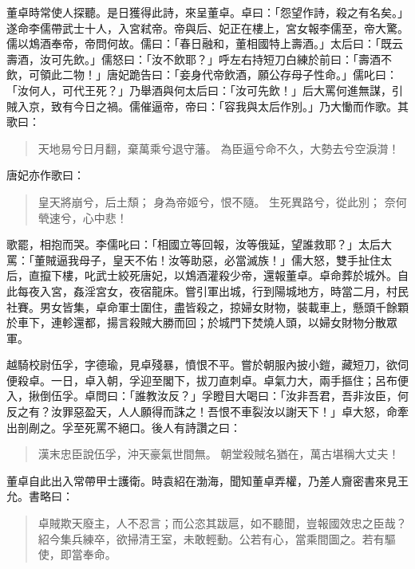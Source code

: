 董卓時常使人探聽。是日獲得此詩，來呈董卓。卓曰：「怨望作詩，殺之有名矣。」遂命李儒帶武士十人，入宮弒帝。帝與后、妃正在樓上，宮女報李儒至，帝大驚。儒以鴆酒奉帝，帝問何故。儒曰：「春日融和，董相國特上壽酒。」太后曰：「既云壽酒，汝可先飲。」儒怒曰：「汝不飲耶？」呼左右持短刀白練於前曰：「壽酒不飲，可領此二物！」唐妃跪告曰：「妾身代帝飲酒，願公存母子性命。」儒叱曰：「汝何人，可代王死？」乃舉酒與何太后曰：「汝可先飲！」后大罵何進無謀，引賊入京，致有今日之禍。儒催逼帝，帝曰：「容我與太后作別。」乃大慟而作歌。其歌曰：

\begin{quote}
天地易兮日月翻，棄萬乘兮退守藩。
為臣逼兮命不久，大勢去兮空淚潸！
\end{quote}

唐妃亦作歌曰：

\begin{quote}
皇天將崩兮，后土頹；
身為帝姬兮，恨不隨。
生死異路兮，從此別；
奈何煢速兮，心中悲！
\end{quote}

歌罷，相抱而哭。李儒叱曰：「相國立等回報，汝等俄延，望誰救耶？」太后大罵：「董賊逼我母子，皇天不佑！汝等助惡，必當滅族！」儒大怒，雙手扯住太后，直攛下樓，叱武士絞死唐妃，以鴆酒灌殺少帝，還報董卓。卓命葬於城外。自此每夜入宮，姦淫宮女，夜宿龍床。嘗引軍出城，行到陽城地方，時當二月，村民社賽。男女皆集，卓命軍士圍住，盡皆殺之，掠婦女財物，裝載車上，懸頭千餘顆於車下，連軫還都，揚言殺賊大勝而回；於城門下焚燒人頭，以婦女財物分散眾軍。

越騎校尉伍孚，字德瑜，見卓殘暴，憤恨不平。嘗於朝服內披小鎧，藏短刀，欲伺便殺卓。一日，卓入朝，孚迎至閣下，拔刀直刺卓。卓氣力大，兩手摳住；呂布便入，揪倒伍孚。卓問曰：「誰教汝反？」孚瞪目大喝曰：「汝非吾君，吾非汝臣，何反之有？汝罪惡盈天，人人願得而誅之！吾恨不車裂汝以謝天下！」卓大怒，命牽出剖剮之。孚至死罵不絕口。後人有詩讚之曰：

\begin{quote}
漢末忠臣說伍孚，沖天豪氣世間無。
朝堂殺賊名猶在，萬古堪稱大丈夫！
\end{quote}

董卓自此出入常帶甲士護衛。時袁紹在渤海，聞知董卓弄權，乃差人齎密書來見王允。書略曰：

\begin{quote}
卓賊欺天廢主，人不忍言；而公恣其跋扈，如不聽聞，豈報國效忠之臣哉？紹今集兵練卒，欲掃清王室，未敢輕動。公若有心，當乘間圖之。若有驅使，即當奉命。
\end{quote}

